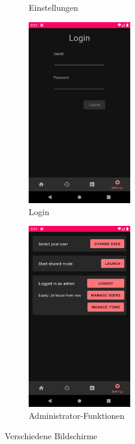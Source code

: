 \documentclass[a4paper, 11pt]{article}
\begin{document}
\begin{figure}[]
\begin{subfigure}{.5\textwidth}
		\caption{Einstellungen}
		\label{fig:app:architecture:functionality:various:settings}
	\end{subfigure}
	\begin{subfigure}{.5\textwidth}
		\centering
		\includegraphics[height=8cm,keepaspectratio]{./images/screenshots/login.png}
		\caption{Login}
		\label{fig:app:architecture:functionality:various:login}
	\end{subfigure}
	\begin{subfigure}{.5\textwidth}
		\centering
		\includegraphics[height=8cm,keepaspectratio]{./images/screenshots/settings-admin.png}
		\caption{Administrator-Funktionen}
		\label{fig:app:architecture:functionality:various:adminfunctions}
	\end{subfigure}
	\caption{Verschiedene Bildschirme}
	\label{fig:app:architecture:functionality:various}
\end{figure}
\end{document}
